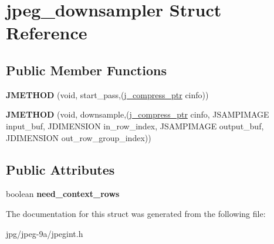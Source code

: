 \hypertarget{structjpeg__downsampler}{\section{jpeg\+\_\+downsampler Struct Reference}
\label{structjpeg__downsampler}
}
\subsection*{Public Member Functions}
\begin{DoxyCompactItemize}
\item 
\hypertarget{structjpeg__downsampler_a1ca33229e63cdb80020c714f1cd28ea0}{{\bfseries J\+M\+E\+T\+H\+O\+D} (void, start\+\_\+pass,(\hyperlink{structjpeg__compress__struct}{j\+\_\+compress\+\_\+ptr} cinfo))}\label{structjpeg__downsampler_a1ca33229e63cdb80020c714f1cd28ea0}

\item 
\hypertarget{structjpeg__downsampler_a611ebcb0ae11e4d1c6ba4222caacaec4}{{\bfseries J\+M\+E\+T\+H\+O\+D} (void, downsample,(\hyperlink{structjpeg__compress__struct}{j\+\_\+compress\+\_\+ptr} cinfo, J\+S\+A\+M\+P\+I\+M\+A\+G\+E input\+\_\+buf, J\+D\+I\+M\+E\+N\+S\+I\+O\+N in\+\_\+row\+\_\+index, J\+S\+A\+M\+P\+I\+M\+A\+G\+E output\+\_\+buf, J\+D\+I\+M\+E\+N\+S\+I\+O\+N out\+\_\+row\+\_\+group\+\_\+index))}\label{structjpeg__downsampler_a611ebcb0ae11e4d1c6ba4222caacaec4}

\end{DoxyCompactItemize}
\subsection*{Public Attributes}
\begin{DoxyCompactItemize}
\item 
\hypertarget{structjpeg__downsampler_ab177a119691924a4bdd2223df7f5ed08}{boolean {\bfseries need\+\_\+context\+\_\+rows}}\label{structjpeg__downsampler_ab177a119691924a4bdd2223df7f5ed08}

\end{DoxyCompactItemize}


The documentation for this struct was generated from the following file\+:\begin{DoxyCompactItemize}
\item 
jpg/jpeg-\/9a/jpegint.\+h\end{DoxyCompactItemize}
